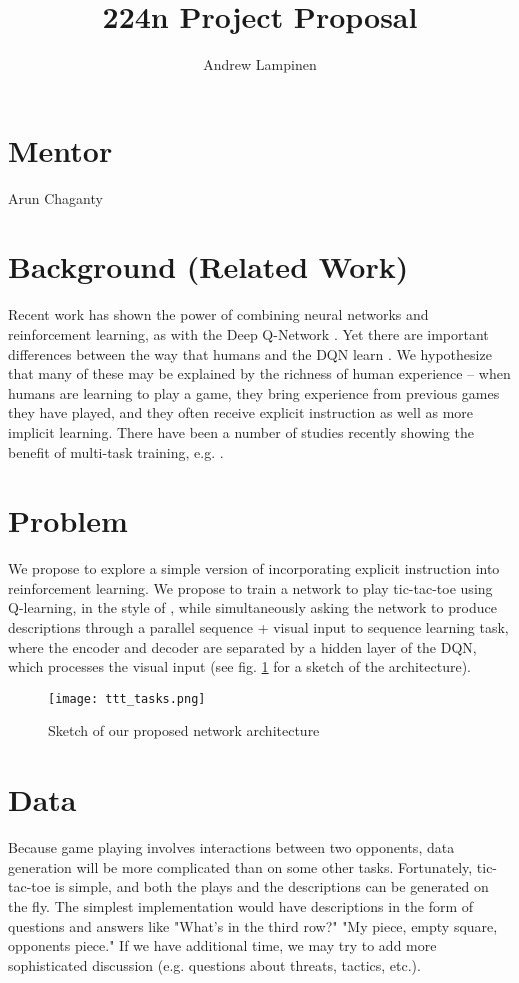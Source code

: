\documentclass[11pt]{article}
\begin{document}
 
\setcounter{secnumdepth}{1}
\title{224n Project Proposal }
\author{Andrew Lampinen}
\date{}
\maketitle

\section{Mentor}
Arun Chaganty
\section{Background (Related Work)}
Recent work has shown the power of combining neural networks and reinforcement learning, as with the Deep Q-Network \cite{Mnih2015}. Yet there are important differences between the way that humans and the DQN learn \cite{Lake2016}. We hypothesize that many of these may be explained by the richness of human experience -- when humans are learning to play a game, they bring experience from previous games they have played, and they often receive explicit instruction as well as more implicit learning. There have been a number of studies recently showing the benefit of multi-task training, e.g. \cite{Luong2016}. 

\section{Problem}
We propose to explore a simple version of incorporating explicit instruction into reinforcement learning. We propose to train a network to play tic-tac-toe using Q-learning, in the style of \cite{Mnih2015}, while simultaneously asking the network to produce descriptions through a parallel sequence + visual input to sequence learning task, where the encoder and decoder are separated by a hidden layer of the DQN, which processes the visual input (see fig. \ref{network_diagram} for a sketch of the architecture).  
\begin{figure}
\centering
\texttt{[image: ttt\_tasks.png]}
\caption{Sketch of our proposed network architecture}
\label{network_diagram}
\end{figure}

\section{Data}
Because game playing involves interactions between two opponents, data generation will be more complicated than on some other tasks. Fortunately, tic-tac-toe is simple, and both the plays and the descriptions can be generated on the fly. The simplest implementation would have descriptions in the form of questions and answers like "What's in the third row?" "My piece, empty square, opponents piece." If we have additional time, we may try to add more sophisticated discussion (e.g. questions about threats, tactics, etc.). 
\end{document}
